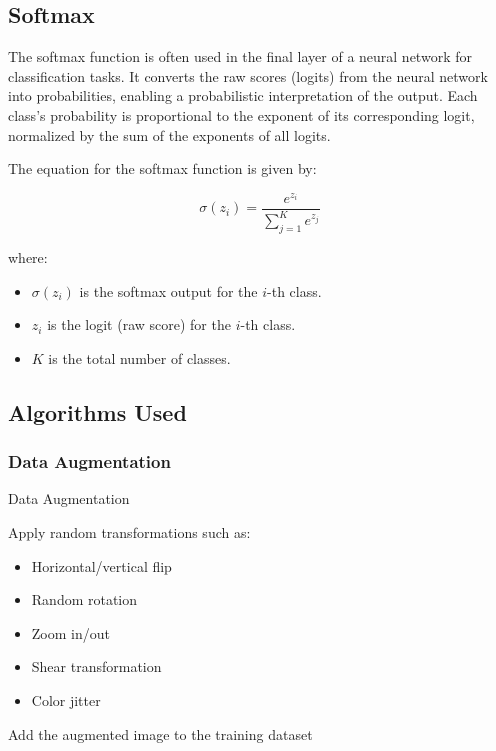 \subsection{Softmax}

The softmax function is often used in the final layer of a neural network for
classification tasks. It converts the raw scores (logits) from the neural
network into probabilities, enabling a probabilistic interpretation of the
output. Each class's probability is proportional to the exponent of its
corresponding logit, normalized by the sum of the exponents of all logits.

The equation for the softmax function is given by:

\[
    \sigma(z_i) = \frac{e^{z_i}}{\sum_{j=1}^{K} e^{z_j}}
\]

where:
\begin{itemize}
    \item \( \sigma(z_i) \) is the softmax output for the \(i\)-th class.
    \item \( z_i \) is the logit (raw score) for the \(i\)-th class.
    \item \( K \) is the total number of classes.
\end{itemize}

\subsection{Algorithms Used}

\subsubsection{Data Augmentation}


\begin{algorithm}
    \caption{Data Augmentation}
    \begin{algorithmic}[1]
        \STATE Apply random transformations such as:
        \begin{itemize}
            \item Horizontal/vertical flip
            \item Random rotation
            \item Zoom in/out
            \item Shear transformation
            \item Color jitter
        \end{itemize}
        \STATE Add the augmented image to the training dataset
        \ENDFOR
    \end{algorithmic}
\end{algorithm}

